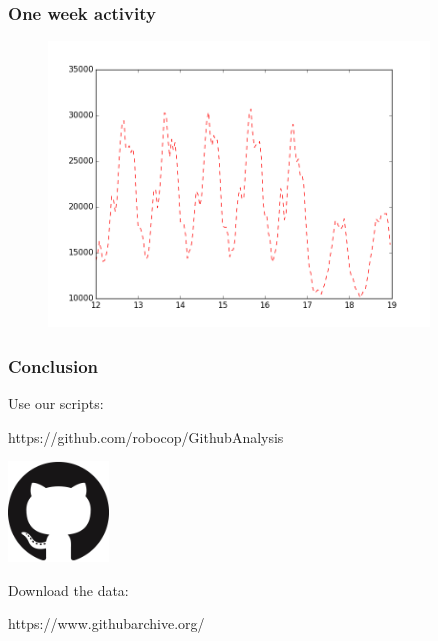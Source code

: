 \documentclass[12pt,t]{beamer}
\begin{document}
\begin{frame}
    \frametitle{One week activity}
        \begin{figure}
        \includegraphics[width=0.9\textwidth]{oneweekofactivity.png}
        \end{figure}
\end{frame}

\begin{frame}
    \frametitle{Conclusion}
    
    Use our scripts:
    \begin{center}
      https://github.com/robocop/GithubAnalysis
    \end{center}
   
    \begin{center}
        \includegraphics[width=0.2\textwidth]{octocat2.png}
    \end{center}

    Download the data:
    \begin{center}
      https://www.githubarchive.org/
    \end{center}

\end{frame}
\end{document}
